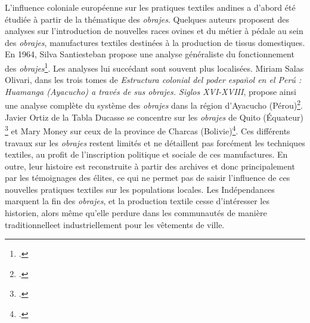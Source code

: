 L'influence coloniale européenne sur les pratiques textiles andines a d'abord été étudiée à partir de la thématique des \textit{obrajes}. Quelques auteurs proposent des analyses sur l'introduction de nouvelles races ovines et du métier à pédale au sein des \textit{obrajes}, manufactures textiles destinées à la production de tissus domestiques. En 1964, Silva Santiesteban propose une analyse généraliste du fonctionnement des \textit{obrajes}\footcite{silvasantistebanObrajesVirreinatoPeru1964}. Les analyses lui succédant sont souvent plus localisées. Miriam Salas Olivari, dans les trois tomes de \textit{Estructura colonial del poder español en el Perú : Huamanga (Ayacucho) a través de sus obrajes. Siglos XVI-XVIII}, propose ainsi une analyse complète du système des \textit{obrajes} dans la région d'Ayacucho (Pérou)\footcite{salasolivariEstructuraColonialPoder1998}. Javier Ortiz de la Tabla Ducasse se concentre sur les \textit{obrajes} de Quito (Équateur) \footcite{ortizdelatabladucasseObrajesObrajerosQuito1982} et Mary Money sur ceux de la province de Charcas (Bolivie)\footcite{moneyObrajesTrajeComercio1983}. Ces différents travaux sur les \textit{obrajes} restent limités et ne détaillent pas forcément les techniques textiles, au profit de l'inscription politique et sociale de ces manufactures. En outre, leur histoire est reconstruite à partir des archives et donc principalement par les témoignages des élites, ce qui ne permet pas de saisir l'influence de ces nouvelles pratiques textiles sur les populations locales. Les Indépendances marquent la fin des \textit{obrajes}, et la production textile cesse d'intéresser les historien, alors même qu'elle perdure dans les communautés de manière \og traditionnelle\fg \:et industriellement pour les vêtements de ville. 

